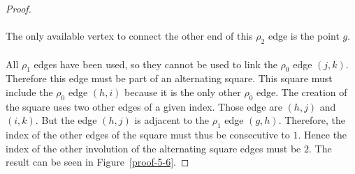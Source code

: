 \begin{proof}
\paragraph{}
The only available vertex to connect the other end of this $\rho_2$ edge is the point $g$.

\begin{figure}[H]
  \begin{center}
    \caption{}
    \label{proof-5-5}
  \end{center}
\end{figure}

\paragraph{}
All $\rho_1$ edges have been used, so they cannot be used to link the $\rho_0$ edge $(j,k)$. Therefore this edge must be part of an alternating square. This square must include the $\rho_0$ edge $(h,i)$ because it is the only other $\rho_0$ edge. The creation of the square uses two other edges of a given index. Those edge are $(h,j)$ and $(i,k)$. But the edge $(h,j)$ is adjacent to the $\rho_1$ edge $(g,h)$. Therefore, the index of the other edges of the square must thus be consecutive to $1$. Hence the index of the other involution of the alternating square edges must be $2$. The result can be seen in Figure~\ref{proof-5-6}.


\end{proof}

